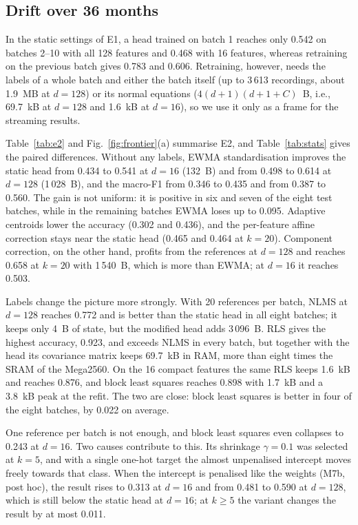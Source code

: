 \documentclass[journal,twoside,web]{ieeecolor}
\begin{document}
\subsection{Drift over 36 months}
In the static settings of E1, a head trained on batch 1 reaches only 0.542 on batches 2--10 with all 128 features and 0.468 with 16 features, whereas retraining on the previous batch gives 0.783 and 0.606. Retraining, however, needs the labels of a whole batch and either the batch itself (up to 3\,613 recordings, about 1.9~MB at $d=128$) or its normal equations ($4(d+1)(d+1+C)$~B, i.e., 69.7~kB at $d=128$ and 1.6~kB at $d=16$), so we use it only as a frame for the streaming results.



Table~\ref{tab:e2} and Fig.~\ref{fig:frontier}(a) summarise E2, and Table~\ref{tab:stats} gives the paired differences. Without any labels, EWMA standardisation improves the static head from 0.434 to 0.541 at $d=16$ (132~B) and from 0.498 to 0.614 at $d=128$ (1\,028~B), and the macro-F1 from 0.346 to 0.435 and from 0.387 to 0.560. The gain is not uniform: it is positive in six and seven of the eight test batches, while in the remaining batches EWMA loses up to 0.095. Adaptive centroids lower the accuracy (0.302 and 0.436), and the per-feature affine correction stays near the static head (0.465 and 0.464 at $k=20$). Component correction, on the other hand, profits from the references at $d=128$ and reaches 0.658 at $k=20$ with 1\,540~B, which is more than EWMA; at $d=16$ it reaches 0.503.



Labels change the picture more strongly. With 20 references per batch, NLMS at $d=128$ reaches 0.772 and is better than the static head in all eight batches; it keeps only 4~B of state, but the modified head adds 3\,096~B. RLS gives the highest accuracy, 0.923, and exceeds NLMS in every batch, but together with the head its covariance matrix keeps 69.7~kB in RAM, more than eight times the SRAM of the Mega2560. On the 16 compact features the same RLS keeps 1.6~kB and reaches 0.876, and block least squares reaches 0.898 with 1.7~kB and a 3.8~kB peak at the refit. The two are close: block least squares is better in four of the eight batches, by 0.022 on average.

One reference per batch is not enough, and block least squares even collapses to 0.243 at $d=16$. Two causes contribute to this. Its shrinkage $\gamma=0.1$ was selected at $k=5$, and with a single one-hot target the almost unpenalised intercept moves freely towards that class. When the intercept is penalised like the weights (M7b, post hoc), the result rises to 0.313 at $d=16$ and from 0.481 to 0.590 at $d=128$, which is still below the static head at $d=16$; at $k\ge5$ the variant changes the result by at most 0.011.
\end{document}
